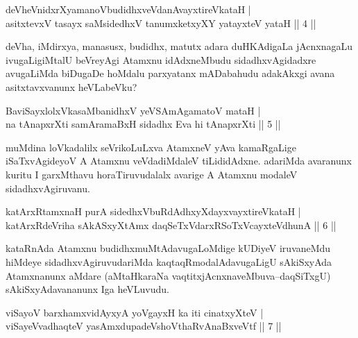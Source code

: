 
\begin{shl}
deVheVnidxrXyamanoVbudidhxveVdanAvayxtireVkataH |\\
asitxtevxV tasayx saMsidedhxV tanumxketxyXY yatayxteV yataH \hfill || 4 ||
\end{shl}

\begin{artha}
deVha, iMdirxya, manasusx, budidhx, matutx adara duHKAdigaLa jAcnxnagaLu ivugaLigiMtalU beVreyAgi Atamxnu idAdxneMbudu sidadhxvAgidadxre avugaLiMda biDugaDe hoMdalu parxyatanx mADabahudu adakAkxgi avana asitxtavxvanunx heVLabeVku?
\end{artha}


\begin{shl}
BaviSayxlolxVkasaMbanidhxV yeVSAmAgamatoV mataH |\\
na tAnapxrXti samAramaBxH sidadhx Eva hi tAnapxrXti \hfill || 5 ||
\end{shl}

\begin{artha}
muMdina loVkadalilx seVrikoLuLxva AtamxneV yAva kamaRgaLige iSaTxvAgideyoV A Atamxnu veVdadiMdaleV tiLididAdxne. adariMda avaranunx kuritu I garxMthavu horaTiruvudalalx avarige A Atamxnu modaleV sidadhxvAgiruvanu.
\end{artha}

\begin{shl}
katArxRtamxnaH purA sidedhxVbuRdAdhxyXdayxvayxtireVkataH |\\
katArxRdeVriha sAkASxyXtAmx daqSeTxVdarxRSoTxVcayxteV\s dhunA \hfill || 6 ||
\end{shl}

\begin{artha}
kataRnAda Atamxnu budidhxmuMtAdavugaLoMdige kUDiyeV iruvaneMdu hiMdeye sidadhxvAgiruvudariMda kaqtaqRmodalAdavugaLigU sAkiSxyAda Atamxnanunx aMdare (aMtaHkaraNa vaqtitxjAcnxnaveMbuva--daqSiTxgU) sAkiSxyAdavananunx Iga heVLuvudu.
\end{artha}

\begin{shl}
viSayoV barxhamxvidAyxyA yoVgayxH ka iti cinatxyXteV |\\
viSayeV\s vadhaqteV yasAmxdupadeVshoV\s thaRvAnaBxveVtf \hfill || 7 ||
\end{shl}

